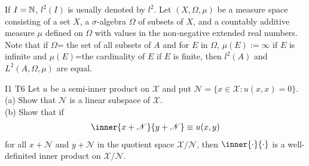 If $I=\mathbb{N}$, $l^2(I)$ is usually denoted by $l^2$. Let $(X,\Omega, \mu)$ be a measure space consisting of a set $X$, a 
$\sigma$-algebra $\Omega$ of subsets of $X$, and a countably additive measure $\mu$ defined 
on $\Omega$ with values in the non-negative extended real numbers.
Note that if $\Omega$= the set of all subsets of $A$ and for $E$ in $\Omega$, $\mu(E):=\infty$ if $E$ is infinite and $\mu(E)$=the cardinality of $E$ if $E$ is finite, 
then $l^2(A)$ and $L^2(A,\Omega,\mu)$ are equal.


\begin{exercise}{I1 T6}{}
    Let $u$ be a semi-inner product on $\mathscr{X}$ and put $\mathscr{N}=\{x\in \mathscr{X}:u(x,x)=0\}$.\\
    (a) Show that $\mathscr{N}$ is a linear subspace of $\mathscr{X}$.\\
    (b) Show that if 
    \begin{align*}
        \inner{x+\mathscr{N}}{y+\mathscr{N}} \equiv u(x,y)
    \end{align*}
    for all $x+\mathscr{N}$ and $y+\mathscr{N}$ in the quotient space $\mathscr{X}/\mathcal{N}$,
    then $\inner{\cdot}{\cdot}$ is a well-definited inner product on $\mathscr{X}/\mathcal{N}$.
\end{exercise}
